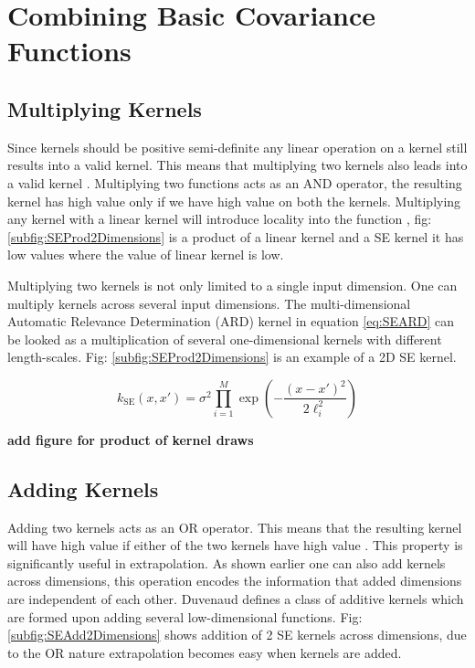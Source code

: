 \chapter{Combining Basic Covariance Functions}
\label{chapCombiningBasicCovariances}

\section{Multiplying Kernels} \label{subsec:structureKernelsMultiplyingKernels}
Since kernels should be positive semi-definite any linear operation on a kernel still results into a valid kernel. This means that multiplying two kernels also leads into a valid kernel \cite{bishop2006pattern} \cite{mackay2003information}. Multiplying two functions acts as an AND operator, the resulting kernel has high value only if we have high value on both the kernels. Multiplying any kernel with a linear kernel will introduce locality into the function , fig: \ref{subfig:SEProd2Dimensions} is a product of a linear kernel and a SE kernel it has low values where the value of linear kernel is low.

Multiplying two kernels is not only limited to a single input dimension. One can multiply kernels across several input dimensions. The multi-dimensional Automatic Relevance Determination (ARD) kernel in equation \ref{eq:SEARD} can be looked as a multiplication of several one-dimensional kernels with different length-scales. Fig: \ref{subfig:SEProd2Dimensions} is an example of a 2D SE kernel.

\begin{equation}\label{eq:SEARD}
k_{\textrm{SE}}(x, x') = \sigma^2\prod_{i=1}^{M}\exp\left(-\frac{(x - x')^2}{2\ell_{i}^2}\right)
\end{equation}

\textbf{add figure for product of kernel draws}


\section{Adding Kernels} \label{subsec:structureKernelsAddingKernels}
Adding two kernels acts as an OR operator. This means that the resulting kernel will have high value if either of the two kernels have high value \cite{durrande2011additive}. This property is significantly useful in extrapolation. As shown earlier one can also add kernels across dimensions, this operation encodes the information that added dimensions are independent of each other. Duvenaud \cite{duvenaud2011additive} defines a class of additive kernels which are formed upon adding several low-dimensional functions. Fig: \ref{subfig:SEAdd2Dimensions} shows addition of 2 SE kernels across dimensions, due to the OR nature extrapolation becomes easy when kernels are added.

